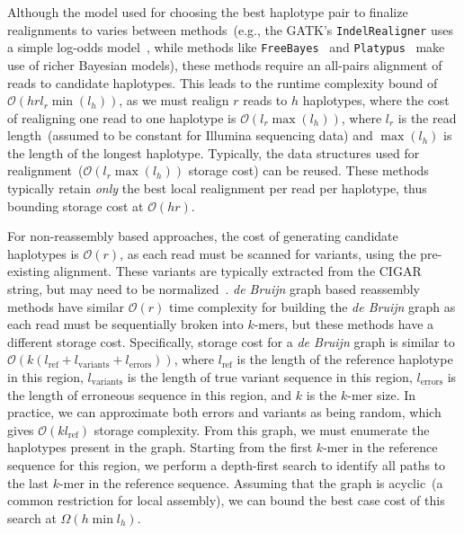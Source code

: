 \documentclass[masters]{ucbthesis}
\begin{document}
Although the model used for choosing the best haplotype pair to finalize realignments to varies between
methods~(e.g., the GATK's \texttt{IndelRealigner} uses a simple log-odds model~\cite{depristo11}, while
methods like \texttt{FreeBayes}~\cite{garrison12} and \texttt{Platypus}~\cite{rimmer14} make use of richer
Bayesian models), these methods require an all-pairs alignment of reads to candidate
haplotypes. This leads to the runtime complexity bound of $\mathcal{O}(h r l_r \min(l_h))$,
as we must realign $r$ reads to $h$ haplotypes, where the cost of realigning
one read to one haplotype is $\mathcal{O}(l_r \max(l_h))$, where $l_r$ is the read length~(assumed to be
constant for Illumina sequencing data) and $\max(l_h)$ is the length of the longest haplotype. Typically,
the data structures used for realignment~($\mathcal{O}(l_r \max(l_h))$ storage cost) can be reused.
These methods typically retain \emph{only} the best local realignment per read per haplotype, thus
bounding storage cost at $\mathcal{O}(h r)$.

For non-reassembly based approaches, the cost of generating candidate haplotypes is $\mathcal{O}(r)$,
as each read must be scanned for variants, using the pre-existing alignment. These variants are typically
extracted from the CIGAR string, but may need to be normalized~\cite{li14}. \emph{de Bruijn} graph based 
reassembly methods have similar $\mathcal{O}(r)$ time complexity for building the \emph{de Bruijn}
graph as each read must be sequentially broken into $k$-mers, but these methods have a different
storage cost. Specifically, storage cost for a \emph{de Bruijn} graph is similar to $\mathcal{O}(k
(l_{\text{ref}} + l_{\text{variants}} + l_{\text{errors}}))$, where $l_{\text{ref}}$ is the length of the reference
haplotype in this region, $l_{\text{variants}}$ is the length of true variant sequence in this region, 
$l_{\text{errors}}$ is the length of erroneous sequence in this region, and $k$ is the $k$-mer size. In
practice, we can approximate both errors and variants as being random, which gives $\mathcal{O}(k
l_{\text{ref}})$ storage complexity. From this graph, we must enumerate the haplotypes present in the
graph. Starting from the first $k$-mer in the reference sequence for this region, we perform a depth-first
search to identify all paths to the last $k$-mer in the reference sequence. Assuming that the graph is
acyclic~(a common restriction for local assembly), we can
bound the best case cost of this search at $\Omega(h \min l_h)$.
\end{document}
